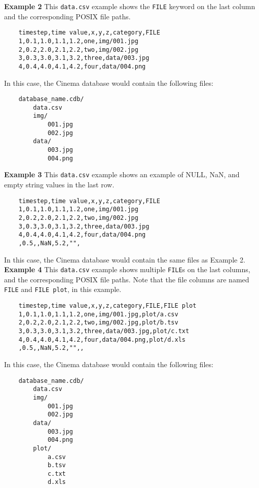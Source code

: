 \noindent
\textbf{Example 2} This \texttt{\small data.csv} example shows the 
\texttt{\small FILE} keyword on the last column and the corresponding
POSIX file paths.

\begin{verbatim}
    timestep,time value,x,y,z,category,FILE
    1,0.1,1.0,1.1,1.2,one,img/001.jpg
    2,0.2,2.0,2.1,2.2,two,img/002.jpg
    3,0.3,3.0,3.1,3.2,three,data/003.jpg
    4,0.4,4.0,4.1,4.2,four,data/004.png 
\end{verbatim}

\noindent
In this case, the Cinema database would contain the following files:

\begin{verbatim}
    database_name.cdb/
        data.csv
        img/
            001.jpg
            002.jpg
        data/
            003.jpg
            004.png
\end{verbatim}

\noindent
\textbf{Example 3} This \texttt{\small data.csv} example shows an example
of NULL, NaN, and empty string values in the last row.

\begin{verbatim}
    timestep,time value,x,y,z,category,FILE
    1,0.1,1.0,1.1,1.2,one,img/001.jpg
    2,0.2,2.0,2.1,2.2,two,img/002.jpg
    3,0.3,3.0,3.1,3.2,three,data/003.jpg
    4,0.4,4.0,4.1,4.2,four,data/004.png 
    ,0.5,,NaN,5.2,"",
\end{verbatim}

\noindent
In this case, the Cinema database would contain the same files as 
Example 2. \\

\noindent
\textbf{Example 4} This \texttt{\small data.csv} example shows multiple
\texttt{\small FILE}s on the last columns, and the corresponding POSIX file 
paths. Note that the file columns are named \texttt{\small FILE}
and \texttt{\small FILE plot}, in this example.

\begin{verbatim}
    timestep,time value,x,y,z,category,FILE,FILE plot
    1,0.1,1.0,1.1,1.2,one,img/001.jpg,plot/a.csv
    2,0.2,2.0,2.1,2.2,two,img/002.jpg,plot/b.tsv
    3,0.3,3.0,3.1,3.2,three,data/003.jpg,plot/c.txt
    4,0.4,4.0,4.1,4.2,four,data/004.png,plot/d.xls
    ,0.5,,NaN,5.2,"",,
\end{verbatim}

\noindent
In this case, the Cinema database would contain the following files:

\begin{verbatim}
    database_name.cdb/
        data.csv
        img/
            001.jpg
            002.jpg
        data/
            003.jpg
            004.png
        plot/
            a.csv
            b.tsv
            c.txt
            d.xls
\end{verbatim}

